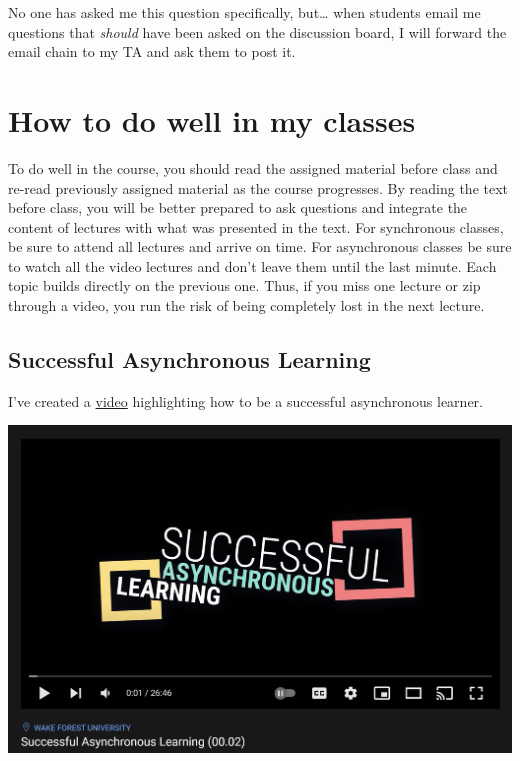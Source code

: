 No one has asked me this question specifically, but\ldots{} when students email me questions that \emph{should} have been asked on the discussion board, I will forward the email chain to my TA and ask them to post it.

\hypertarget{how-to-do-well-in-my-classes}{%
\chapter{How to do well in my classes}\label{how-to-do-well-in-my-classes}}

To do well in the course, you should read the assigned material before class and re-read previously assigned material as the course progresses.
By reading the text before class, you will be better prepared to ask questions and integrate the content of lectures with what was presented in the text.
For synchronous classes, be sure to attend all lectures and arrive on time.
For asynchronous classes be sure to watch all the video lectures and don't leave them until the last minute. Each topic builds directly on the previous one.
Thus, if you miss one lecture or zip through a video, you run the risk of being completely lost in the next lecture.

\hypertarget{successful-asynchronous-learning}{%
\section{Successful Asynchronous Learning}\label{successful-asynchronous-learning}}

I've created a \href{https://youtu.be/dc3D2tbl8G0}{video} highlighting how to be a successful asynchronous learner.

\includegraphics[width=30.76in]{img/learngood}

